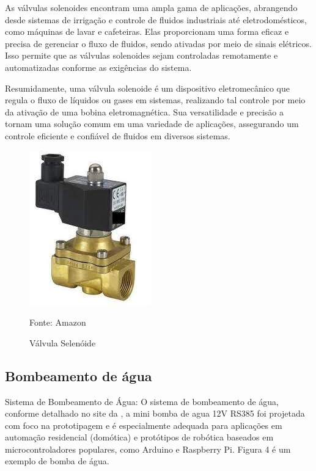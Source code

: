 As válvulas solenoides encontram uma ampla gama de aplicações, abrangendo desde sistemas de irrigação e controle de fluidos industriais até eletrodomésticos, como máquinas de lavar e cafeteiras. Elas proporcionam uma forma eficaz e precisa de gerenciar o fluxo de fluidos, sendo ativadas por meio de sinais elétricos. Isso permite que as válvulas solenoides sejam controladas remotamente e automatizadas conforme as exigências do sistema.

Resumidamente, uma válvula solenoide é um dispositivo eletromecânico que regula o fluxo de líquidos ou gases em sistemas, realizando tal controle por meio da ativação de uma bobina eletromagnética. Sua versatilidade e precisão a tornam uma solução comum em uma variedade de aplicações, assegurando um controle eficiente e confiável de fluidos em diversos sistemas.

 \begin{figure}[H]
    \caption{Válvula Selenóide}
    \label{fig:valvulaImagem}
    \begin{center}
        
        \includegraphics[scale=1]{Textuais/imagens/valvula.png}
        
        Fonte: Amazon
    \end{center}
\end{figure}

\subsection{Bombeamento de água}
Sistema de Bombeamento de Água: O sistema de bombeamento de água, conforme detalhado no site da \cite{bomba}, a mini bomba de agua 12V RS385 foi projetada com foco na prototipagem e é especialmente adequada para aplicações em automação residencial (domótica) e protótipos de robótica baseados em microcontroladores populares, como Arduino e Raspberry Pi. Figura 4 é um exemplo de bomba de água.

